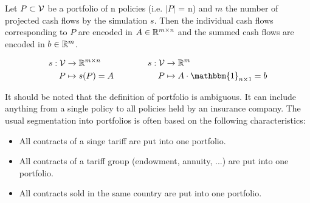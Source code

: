 \begin{definition}
	Let $P \subset \mathcal{V}$ be a portfolio of n policies (i.e. $\vert P \vert$ = n) and $m$ the number of projected cash flows by the simulation $s$. Then the individual cash flows corresponding to $P$ are encoded in $A \in \mathbb{R}^{m \times n}$ and the summed cash flows are encoded in $b \in \mathbb{R}^m$.

	\begin{equation*}
	\begin{aligned}[c]
	s: \V &\rightarrow \R^{m \times n}\\
		P & \mapsto s(P)=A\\
	\end{aligned}
	\qquad \qquad
	\begin{aligned}[c]
	s: \V &\rightarrow \R^m\\
		P & \mapsto A \cdot \mathbbm{1}_{n \times 1} = b \\
	\end{aligned}
	\end{equation*}
	
\end{definition}

\begin{remark}
	It should be noted that the definition of portfolio is ambiguous. It can include anything from a single policy to all policies held by an insurance company. The usual segmentation into portfolios is often based on the following characteristics:
	\begin{itemize}
		\item All contracts of a singe tariff are put into one portfolio.
		\item All contracts of a tariff group (endowment, annuity,  ...) are put into one portfolio. 
		\item All contracts sold in the same country are put into one portfolio.
	\end{itemize} 
\end{remark}

